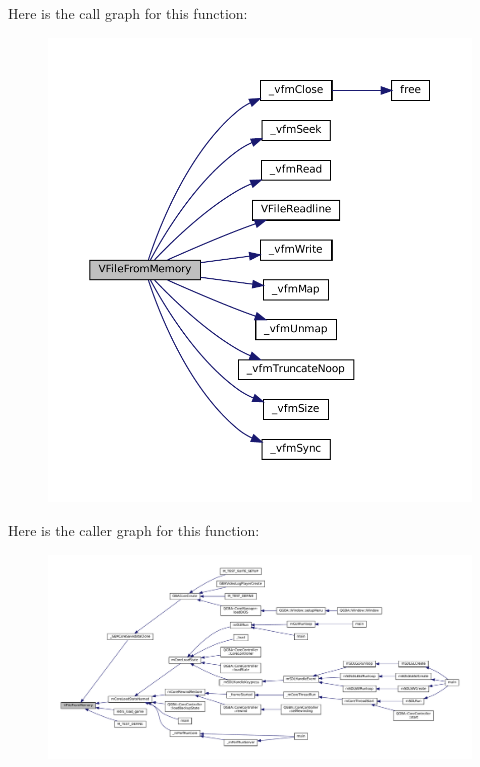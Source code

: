 Here is the call graph for this function\+:
\nopagebreak
\begin{figure}[H]
\begin{center}
\leavevmode
\includegraphics[width=350pt]{vfs-mem_8c_abb2d34da3df9c1711f0d6c04adc7c084_cgraph}
\end{center}
\end{figure}
Here is the caller graph for this function\+:
\nopagebreak
\begin{figure}[H]
\begin{center}
\leavevmode
\includegraphics[width=350pt]{vfs-mem_8c_abb2d34da3df9c1711f0d6c04adc7c084_icgraph}
\end{center}
\end{figure}
\mbox{\label{vfs-mem_8c_a986543bf6b5fd33614d77d3127cefa2a}} 
